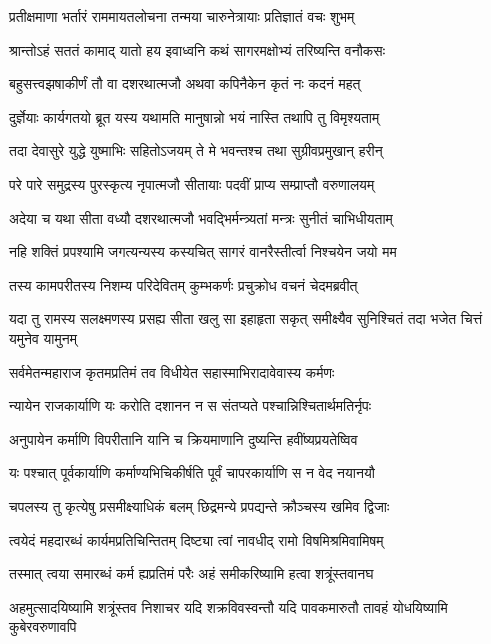 \twolineshloka
{प्रतीक्षमाणा भर्तारं राममायतलोचना}
{तन्मया चारुनेत्रायाः प्रतिज्ञातं वचः शुभम्} %

\twolineshloka
{श्रान्तोऽहं सततं कामाद् यातो हय इवाध्वनि}
{कथं सागरमक्षोभ्यं तरिष्यन्ति वनौकसः} %

\twolineshloka
{बहुसत्त्वझषाकीर्णं तौ वा दशरथात्मजौ}
{अथवा कपिनैकेन कृतं नः कदनं महत्} %

\twolineshloka
{दुर्ज्ञेयाः कार्यगतयो ब्रूत यस्य यथामति}
{मानुषान्नो भयं नास्ति तथापि तु विमृश्यताम्} %

\twolineshloka
{तदा देवासुरे युद्धे युष्माभिः सहितोऽजयम्}
{ते मे भवन्तश्च तथा सुग्रीवप्रमुखान् हरीन्} %

\twolineshloka
{परे पारे समुद्रस्य पुरस्कृत्य नृपात्मजौ}
{सीतायाः पदवीं प्राप्य सम्प्राप्तौ वरुणालयम्} %

\twolineshloka
{अदेया च यथा सीता वध्यौ दशरथात्मजौ}
{भवद्भिर्मन्त्र्यतां मन्त्रः सुनीतं चाभिधीयताम्} %

\twolineshloka
{नहि शक्तिं प्रपश्यामि जगत्यन्यस्य कस्यचित्}
{सागरं वानरैस्तीर्त्वा निश्चयेन जयो मम} %

\twolineshloka
{तस्य कामपरीतस्य निशम्य परिदेवितम्}
{कुम्भकर्णः प्रचुक्रोध वचनं चेदमब्रवीत्} %

\twolineshloka
{यदा तु रामस्य सलक्ष्मणस्य प्रसह्य सीता खलु सा इहाहृता}
{सकृत् समीक्ष्यैव सुनिश्चितं तदा भजेत चित्तं यमुनेव यामुनम्} %

\twolineshloka
{सर्वमेतन्महाराज कृतमप्रतिमं तव}
{विधीयेत सहास्माभिरादावेवास्य कर्मणः} %

\twolineshloka
{न्यायेन राजकार्याणि यः करोति दशानन}
{न स संतप्यते पश्चान्निश्चितार्थमतिर्नृपः} %

\twolineshloka
{अनुपायेन कर्माणि विपरीतानि यानि च}
{क्रियमाणानि दुष्यन्ति हवींष्यप्रयतेष्विव} %

\twolineshloka
{यः पश्चात् पूर्वकार्याणि कर्माण्यभिचिकीर्षति}
{पूर्वं चापरकार्याणि स न वेद नयानयौ} %

\twolineshloka
{चपलस्य तु कृत्येषु प्रसमीक्ष्याधिकं बलम्}
{छिद्रमन्ये प्रपद्यन्ते क्रौञ्चस्य खमिव द्विजाः} %

\twolineshloka
{त्वयेदं महदारब्धं कार्यमप्रतिचिन्तितम्}
{दिष्ट्या त्वां नावधीद् रामो विषमिश्रमिवामिषम्} %

\twolineshloka
{तस्मात् त्वया समारब्धं कर्म ह्यप्रतिमं परैः}
{अहं समीकरिष्यामि हत्वा शत्रूंस्तवानघ} %

\threelineshloka
{अहमुत्सादयिष्यामि शत्रूंस्तव निशाचर}
{यदि शक्रविवस्वन्तौ यदि पावकमारुतौ}
{तावहं योधयिष्यामि कुबेरवरुणावपि} %

